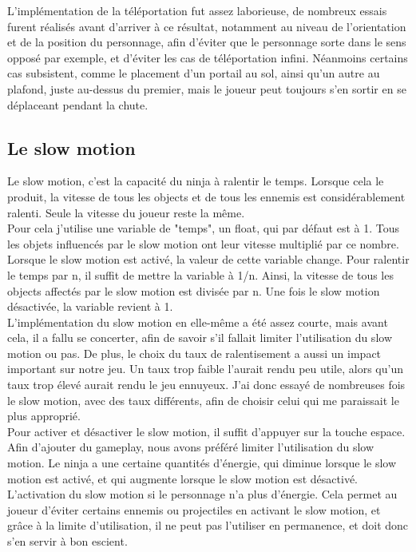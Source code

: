 \documentclass[12pt]{article}
\begin{document}
L'implémentation de la téléportation fut assez laborieuse, de nombreux essais furent réalisés avant d'arriver à ce résultat, notamment au niveau de l'orientation et de la position du personnage, afin d'éviter que le personnage sorte dans le sens opposé par exemple, et d'éviter les cas de téléportation infini. Néanmoins certains cas subsistent, comme le placement d'un portail au sol, ainsi qu'un autre au plafond, juste au-dessus du premier, mais le joueur peut toujours s'en sortir en se déplaceant pendant la chute.

\subsection{Le slow motion}

Le slow motion, c'est la capacité du ninja à ralentir le temps. Lorsque cela le produit, la vitesse de tous les objects et de tous les ennemis est considérablement ralenti. Seule la vitesse du joueur reste la même.\\
Pour cela j'utilise une variable de "temps", un float, qui par défaut est à 1. Tous les objets influencés par le slow motion ont leur vitesse multiplié par ce nombre. Lorsque le slow motion est activé, la valeur de cette variable change. Pour ralentir le temps par n, il suffit de mettre la variable à 1/n. Ainsi, la vitesse de tous les objects affectés par le slow motion est divisée par n. Une fois le slow motion désactivée, la variable revient à 1.\\
L'implémentation du slow motion en elle-même a été assez courte, mais avant cela, il a fallu se concerter, afin de savoir s'il fallait limiter l'utilisation du slow motion ou pas. De plus, le choix du taux de ralentisement a aussi un impact important sur notre jeu. Un taux trop faible l'aurait rendu peu utile, alors qu'un taux trop élevé aurait rendu le jeu ennuyeux. J'ai donc essayé de nombreuses fois le slow motion, avec des taux différents, afin de choisir celui qui me paraissait le plus approprié.\\

Pour activer et désactiver le slow motion, il suffit d'appuyer sur la touche espace. Afin d'ajouter du gameplay, nous avons préféré limiter l'utilisation du slow motion. Le ninja a une certaine quantités d'énergie, qui diminue lorsque le slow motion est activé, et qui augmente lorsque le slow motion est désactivé. L'activation du slow motion si le personnage n'a plus d'énergie. Cela permet au joueur d'éviter certains ennemis ou projectiles en activant le slow motion, et grâce à la limite d'utilisation, il ne peut pas l'utiliser en permanence, et doit donc s'en servir à bon escient.
\end{document}
